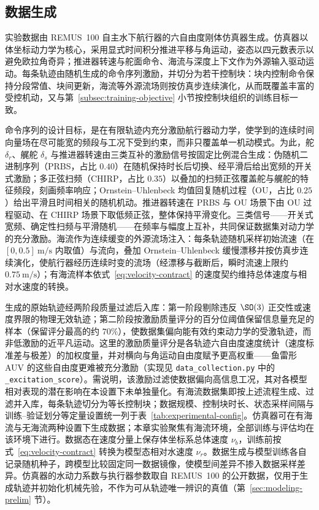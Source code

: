 \subsection{数据生成}
\label{subsec:data-generation}

实验数据由 REMUS~100 自主水下航行器的六自由度刚体仿真器生成。仿真器以体坐标动力学为核心，采用显式时间积分推进平移与角运动，姿态以四元数表示以避免欧拉角奇异；推进器转速与舵面命令、海流与深度上下文作为外源输入驱动运动。每条轨迹由随机生成的命令序列激励，并切分为若干控制块：块内控制命令保持分段常值、块间更新，海流等外源流场则按仿真步连续演化，从而既覆盖丰富的受控机动，又与第~\ref{subsec:training-objective} 小节按控制块组织的训练目标一致。

命令序列的设计目标，是在有限轨迹内充分激励航行器动力学，使学到的连续时间向量场在尽可能宽的频段与工况下受到约束，而非只覆盖单一机动模式。为此，舵 \(\delta_r\)、艉舵 \(\delta_s\) 与推进器转速由三类互补的激励信号按固定比例混合生成：伪随机二进制序列（PRBS，占比 \(0.40\)）在随机保持时长后切换、经平滑后给出宽频的开关式激励；多正弦扫频（CHIRP，占比 \(0.35\)）以叠加的扫频正弦覆盖舵与艉舵的特征频段，刻画频率响应；Ornstein--Uhlenbeck 均值回复随机过程（OU，占比 \(0.25\)）给出平滑且时间相关的随机机动。推进器转速在 PRBS 与 OU 场景下由 OU 过程驱动、在 CHIRP 场景下取低频正弦，整体保持平滑变化。三类信号——开关式宽频、确定性扫频与平滑随机——在频率与幅度上互补，共同保证数据集对动力学的充分激励。海流作为连续缓变的外源流场注入：每条轨迹随机采样初始流速（在 \([0,0.5]~\mathrm{m/s}\) 内取值）与流向，叠加 Ornstein--Uhlenbeck 缓慢漂移并按仿真步连续演化，使航行器经历连续时变的流场（经漂移与截断后，瞬时流速上限约 \(0.75~\mathrm{m/s}\)）；有海流样本依式~\eqref{eq:velocity-contract} 的速度契约维持总体速度与相对水速度的转换。

生成的原始轨迹经两阶段质量过滤后入库：第一阶段剔除违反 \(\SO(3)\) 正交性或速度界限的物理无效轨迹；第二阶段按激励质量评分的百分位阈值保留信息量充足的样本（保留评分最高的约 \(70\%\)），使数据集偏向能有效约束动力学的受激轨迹，而非低激励的近平凡运动。这里的激励质量评分是各轨迹六自由度速度统计（速度标准差与极差）的加权度量，并对横向与角运动自由度赋予更高权重——鱼雷形 AUV 的这些自由度更难被充分激励（实现见 \texttt{data\_collection.py} 中的 \texttt{\_excitation\_score}）。需说明，该激励过滤使数据偏向高信息工况，其对各模型相对表现的潜在影响在本设置下未单独量化。有海流数据集即按上述流程生成、过滤并入库，每条轨迹切分为等长控制块；数据规模、控制块时长、状态采样间隔与训练--验证划分等定量设置统一列于表~\ref{tab:experimental-config}。仿真器可在有海流与无海流两种设置下生成数据；本章实验聚焦有海流环境，全部训练与评估均在该环境下进行。数据态在速度分量上保存体坐标系总体速度 \(\nu_b\)，训练前按式~\eqref{eq:velocity-contract} 转换为模型态相对水速度 \(\nu_r\)。数据生成与模型训练各自记录随机种子，跨模型比较固定同一数据镜像，使模型间差异不掺入数据采样差异。仿真器的水动力系数与执行器参数取自 REMUS~100 的公开数据，仅用于生成轨迹并初始化机械先验，不作为可从轨迹唯一辨识的真值（第~\ref{sec:modeling-prelim} 节）。

